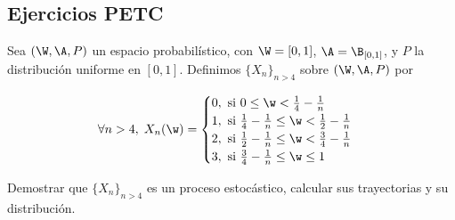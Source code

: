 \subsection{Ejercicios PETC}

\begin{ejer}
  Sea $(\W, \A, P)$ un espacio probabilístico, con $\W = [0,1]$, $\A = \B_{[0,1]}$, y $P$ la distribución uniforme en $[0,1]$. Definimos $\{X_n\}_{n>4}$ sobre $(\W, \A, P)$ por

  \begin{equation*}
    \forall n > 4, \; X_n(\w) = \begin{cases}
      0, \text{ si  } 0 \leq \w < \frac{1}{4} - \frac{1}{n} \\
      1, \text{ si  } \frac{1}{4} - \frac{1}{n} \leq \w < \frac{1}{2} - \frac{1}{n} \\
      2, \text{ si  } \frac{1}{2} - \frac{1}{n} \leq \w < \frac{3}{4} - \frac{1}{n} \\
      3, \text{ si  } \frac{3}{4} - \frac{1}{n} \leq \w \leq 1
    \end{cases}
  \end{equation*}

  Demostrar que $\{X_n\}_{n>4}$ es un proceso estocástico, calcular sus trayectorias y su distribución.
\end{ejer}

